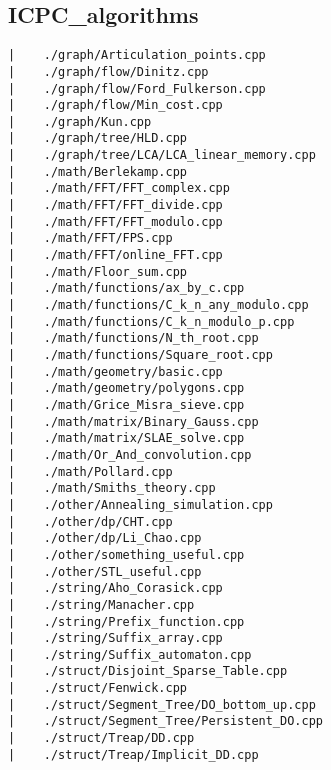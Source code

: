 \documentclass[a4paper, 10pt]{article}
\begin{document}
\begin{center}
\section*{ICPC\_algorithms}
\begin{verbatim}
|    ./graph/Articulation_points.cpp
|    ./graph/flow/Dinitz.cpp
|    ./graph/flow/Ford_Fulkerson.cpp
|    ./graph/flow/Min_cost.cpp
|    ./graph/Kun.cpp
|    ./graph/tree/HLD.cpp
|    ./graph/tree/LCA/LCA_linear_memory.cpp
|    ./math/Berlekamp.cpp
|    ./math/FFT/FFT_complex.cpp
|    ./math/FFT/FFT_divide.cpp
|    ./math/FFT/FFT_modulo.cpp
|    ./math/FFT/FPS.cpp
|    ./math/FFT/online_FFT.cpp
|    ./math/Floor_sum.cpp
|    ./math/functions/ax_by_c.cpp
|    ./math/functions/C_k_n_any_modulo.cpp
|    ./math/functions/C_k_n_modulo_p.cpp
|    ./math/functions/N_th_root.cpp
|    ./math/functions/Square_root.cpp
|    ./math/geometry/basic.cpp
|    ./math/geometry/polygons.cpp
|    ./math/Grice_Misra_sieve.cpp
|    ./math/matrix/Binary_Gauss.cpp
|    ./math/matrix/SLAE_solve.cpp
|    ./math/Or_And_convolution.cpp
|    ./math/Pollard.cpp
|    ./math/Smiths_theory.cpp
|    ./other/Annealing_simulation.cpp
|    ./other/dp/CHT.cpp
|    ./other/dp/Li_Chao.cpp
|    ./other/something_useful.cpp
|    ./other/STL_useful.cpp
|    ./string/Aho_Corasick.cpp
|    ./string/Manacher.cpp
|    ./string/Prefix_function.cpp
|    ./string/Suffix_array.cpp
|    ./string/Suffix_automaton.cpp
|    ./struct/Disjoint_Sparse_Table.cpp
|    ./struct/Fenwick.cpp
|    ./struct/Segment_Tree/DO_bottom_up.cpp
|    ./struct/Segment_Tree/Persistent_DO.cpp
|    ./struct/Treap/DD.cpp
|    ./struct/Treap/Implicit_DD.cpp
\end{verbatim}

\end{center}
\end{document}
